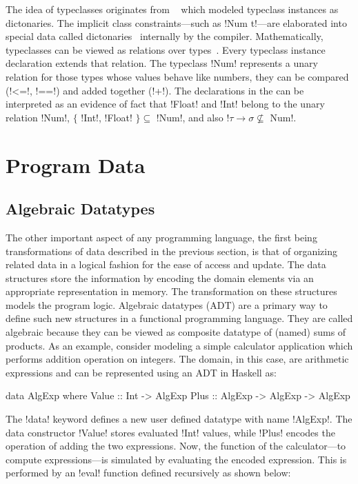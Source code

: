 \documentclass[screen,nonacm,manuscript,review]{acmart} %
\begin{document}
The idea of typeclasses originates from
~\citet{wadler_polymorphism_1989} which modeled typeclass instances as
dictonaries. The implicit class constraints---such as !Num t!---are
elaborated into special data called dictonaries~\cite{hall_type_1994} internally by the
compiler. Mathematically, typeclasses can be viewed as relations
over types~\cite{morris_simple_2014}. Every typeclass instance
declaration extends that relation. The typeclass !Num! represents a unary relation
for those types whose values behave like numbers, they can be compared
(!<=!, !==!) and added together (!+!). The declarations in the
 can be interpreted as an evidence of fact that
!Float! and !Int! belong to the unary relation !Num!,
$\{$ !Int!, !Float! $\} \subseteq$ !Num!, and
also !$\tau \to \sigma \not \subseteq$ Num!.


\section{Program Data}
\subsection{Algebraic Datatypes}
The other important aspect of any programming language, the first
being transformations of data described in the previous section, is
that of organizing related data in a logical fashion for the ease of
access and update. The data structures store the information by
encoding the domain elements via an appropriate representation in
memory. The transformation on these structures models the program
logic. Algebraic datatypes (ADT) are a primary way
to define such new structures in a functional programming language. They are called
algebraic because they can be viewed as composite datatype of (named)
sums of products. As an example, consider modeling a simple calculator
application which performs addition operation on integers. The domain,
in this case, are arithmetic expressions and can be represented using an
ADT in Haskell as:

\begin{CenteredBox}
\begin{code}
data AlgExp where
   Value :: Int    -> AlgExp
   Plus  :: AlgExp -> AlgExp -> AlgExp
\end{code}
\end{CenteredBox}

The !data! keyword defines a new user defined datatype with name
!AlgExp!. The data constructor !Value! stores evaluated !Int! values,
while !Plus! encodes the operation of adding the two expressions. Now,
the function of the calculator---to compute expressions---is simulated
by evaluating the encoded expression. This is performed by an !eval!
function defined recursively as shown below:
\end{document}
